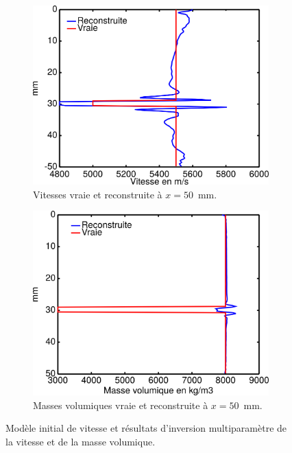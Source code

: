 \begin{figure}[!h]
\begin{subfigure}[b]{0.4\textwidth}
		\includegraphics[width=\textwidth]{img/multi_param/coupe_vp_multi_vert.png}
		\caption{Vitesses vraie et reconstruite à $x=50$~mm.}
	\end{subfigure}
	\begin{subfigure}[b]{0.4\textwidth}
		\includegraphics[width=\textwidth]{img/multi_param/coupe_rho_multi_vert.png}
		\caption{Masses volumiques vraie et reconstruite à $x=50$~mm.}
	\end{subfigure}
	\caption{Modèle initial de vitesse et résultats d'inversion multiparamètre de la vitesse et de la masse volumique.\label{app:inv_multi} }
\end{figure}

